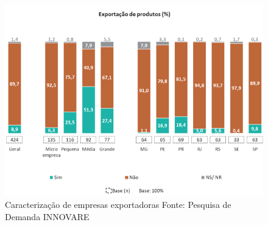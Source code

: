 \begin{figure}[h]
    \centering
    \includegraphics[scale=0.75]{Imagens/Exportacao_2.PNG}
    \caption{Caracterização de empresas exportadoras 
    Fonte: Pesquisa de Demanda INNOVARE}
\end{figure}